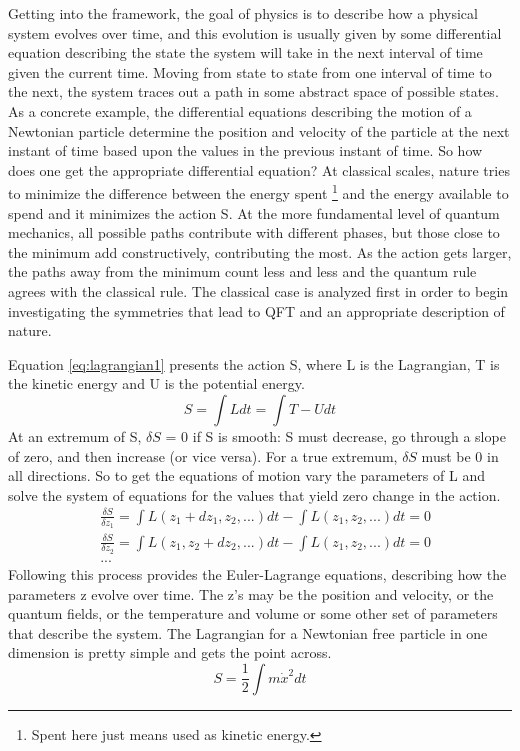 Getting into the framework, the goal of physics is to describe how a physical system evolves over time, and this evolution is usually given by some differential equation describing the state the system will take in the next interval of time given the current time. Moving from state to state from one interval of time to the next, the system traces out a path in some abstract space of possible states. As a concrete example, the differential equations describing the motion of a Newtonian particle determine the position and velocity of the particle at the next instant of time based upon the values in the previous instant of time. So how does one get the appropriate differential equation? At classical scales, nature tries to minimize the difference between the energy spent \footnote{Spent here just means used as kinetic energy.} and the energy available to spend and it minimizes the action S. At the more fundamental level of quantum mechanics, all possible paths contribute with different phases, but those close to the minimum add constructively, contributing the most. As the action gets larger, the paths away from the minimum count less and less and the quantum rule agrees with the classical rule. The classical case is analyzed first in order to begin investigating the symmetries that lead to QFT and an appropriate description of nature. 

Equation \ref{eq:lagrangian1} presents the action S, where L is the Lagrangian, T is the kinetic energy and U is the potential energy.     
\begin{equation}
\label{eq:lagrangian1}
S = \int L dt = \int T - U dt
\end{equation}
At an extremum of S, $\delta S$ = 0 if S is smooth: S must decrease, go through a slope of zero, and then increase (or vice versa). For a true extremum, $\delta S$ must be 0 in all directions. So to get the equations of motion vary the parameters of L and solve the system of equations for the values that yield zero change in the action.
\begin{equation}
\begin{split}
&\frac{\delta S}{\delta z_1} = \int L(z_1 + dz_1, z_2, ...)dt - \int L(z_1, z_2, ...)dt = 0 \\
&\frac{\delta S}{\delta z_2} = \int L(z_1, z_2 + dz_2, ...)dt - \int L(z_1, z_2, ...)dt = 0 \\
&...
\end{split}
\end{equation}
Following this process provides the Euler-Lagrange equations, describing how the parameters z evolve over time. The z's may be the position and velocity, or the quantum fields, or the temperature and volume or some other set of parameters that describe the system. The Lagrangian for a Newtonian free particle in one dimension is pretty simple and gets the point across. 
\begin{equation}
S = \frac{1}{2} \int m\dot{x}^2 dt
\end{equation}


